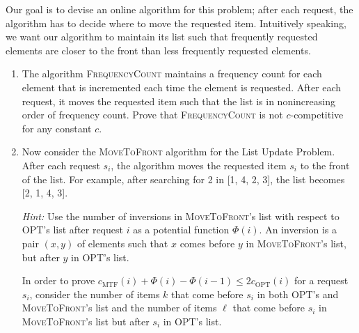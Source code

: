 \documentclass[14pt]{extreport}
\begin{document}
    \vspace{5mm}
    Our goal is to devise an online algorithm for this problem; after each request, the algorithm has to decide where to move the requested item. Intuitively speaking, we want our
    algorithm to maintain its list such that frequently requested elements are closer to the
    front than less frequently requested elements.
    \begin{enumerate}
        \item The algorithm \textsc{FrequencyCount} maintains a frequency count for each element that is incremented each time the element is requested. After each request, it moves the requested item such that the list is in nonincreasing order of frequency count. Prove that \textsc{FrequencyCount} is not $c$-competitive for any constant $c$.
        \item Now consider the \textsc{MoveToFront} algorithm for the List Update Problem. After each request $s_{i}$, the algorithm moves the requested item $s_{i}$ to the front of the list. For example, after searching for 2 in [1, 4, 2, 3], the list becomes [2, 1, 4, 3].

        \vspace{5mm}
        \textit{Hint:} Use the number of inversions in \textsc{MoveToFront}’s list with respect to OPT’s list after request $i$ as a potential function $\Phi(i)$. An inversion is a pair $(x, y)$ of elements such that $x$ comes before $y$ in \textsc{MoveToFront}’s list, but after $y$ in OPT’s list.
        
        \vspace{3mm}
        In order to prove $c_{\text{MTF}}(i) + \Phi(i) - \Phi(i - 1) \leq 2c_{\text{OPT}}(i)$ for a request $s_i$, consider the number of items $k$ that come before $s_i$ in both OPT’s and \textsc{MoveToFront}’s list and the number of items $\ell$ that come before $s_i$ in \textsc{MoveToFront}’s list but after $s_i$ in OPT’s list.
    \end{enumerate}
    
\end{document}
